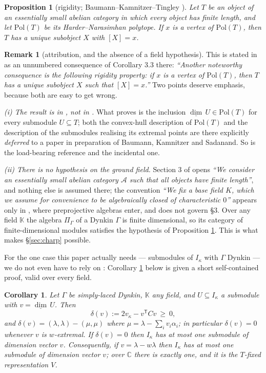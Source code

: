\documentclass[reqno]{amsart}
\theoremstyle{plain}
\newtheorem{proposition}[theorem]{Proposition}
\newtheorem{corollary}[theorem]{Corollary}
\theoremstyle{definition}
\newtheorem{remark}[theorem]{Remark}
\newcommand{\dimv}{\underline{\dim}\,}
\newcommand{\la}{\lambda}
\newcommand{\al}{\alpha}
\newcommand{\ka}{\kappa}
\newcommand{\Pia}{\Pi}
\begin{document}
\begin{proposition}[rigidity; Baumann--Kamnitzer--Tingley {\cite[\S3]{BKT}}]
\label{prop:rig}
Let $T$ be an object of an essentially small abelian category in which every
object has finite length, and let $\mathrm{Pol}(T)$ be its
Harder--Narasimhan polytope.  If $x$ is a vertex of $\mathrm{Pol}(T)$, then
$T$ has a unique subobject $X$ with $[X]=x$.
\end{proposition}

\begin{remark}[attribution, and the absence of a field hypothesis]
\label{rem:rigidity}
This is stated in \cite[\S3]{BKT} as an unnumbered consequence of Corollary
3.3 there: \emph{``Another noteworthy consequence is the following rigidity
property: if $x$ is a vertex of $\mathrm{Pol}(T)$, then $T$ has a unique
subobject $X$ such that $[X]=x$.''}  Two points deserve emphasis, because both
are easy to get wrong.

\emph{(i) The result is in \cite{BKT}, not in \cite{BK}.}  What
\cite[Rem.~4.5]{BK} proves is the inclusion $\dimv U\in\mathrm{Pol}(T)$ for
every submodule $U\subseteq T$; both the convex-hull description of
$\mathrm{Pol}(T)$ and the description of the submodules realising its extremal
points are there explicitly \emph{deferred} to a paper in preparation of
Baumann, Kamnitzer and Sadanand.  So \cite{BKT} is the load-bearing reference
and \cite{BK} the incidental one.

\emph{(ii) There is no hypothesis on the ground field.}  Section 3 of
\cite{BKT} opens \emph{``We consider an essentially small abelian category
$\mathcal{A}$ such that all objects have finite length''}, and nothing else is
assumed there; the convention \emph{``We fix a base field $K$, which we assume
for convenience to be algebraically closed of characteristic $0$''} appears
only in \cite[\S4.1]{BKT}, where preprojective algebras enter, and does not
govern \S3.  Over any field $\mathbb{K}$ the algebra $\Pia_\Gamma$ of a Dynkin
$\Gamma$ is finite dimensional, so its category of finite-dimensional modules
satisfies the hypothesis of Proposition \ref{prop:rig}.  This is what makes
\S\ref{sec:charp} possible.

For the one case this paper actually needs --- submodules of $I_\ka$ with
$\Gamma$ Dynkin --- we do not even have to rely on \cite{BKT}: Corollary
\ref{cor:pol} below is given a short self-contained proof, valid over every
field.
\end{remark}

\begin{corollary}\label{cor:pol}
Let $\Gamma$ be simply-laced Dynkin, $\mathbb{K}$ \emph{any} field, and
$U\subseteq I_\ka$ a submodule with $v=\dimv U$.  Then
\[
   \delta(v):=2v_\ka-v^{\mathsf T}Cv\ \ge\ 0 ,
\]
and $\delta(v)=(\la,\la)-(\mu,\mu)$ where $\mu=\la-\sum_iv_i\al_i$; in
particular $\delta(v)=0$ whenever $v$ is $w$-extremal.  If $\delta(v)=0$ then
$I_\ka$ has \emph{at most one} submodule of dimension vector $v$.
Consequently, if $v=\la-w\la$ then $I_\ka$ has at most one submodule of
dimension vector $v$; over $\mathbb{C}$ there is exactly one, and it is the
$T$-fixed representation $V$.
\end{corollary}
\end{document}
